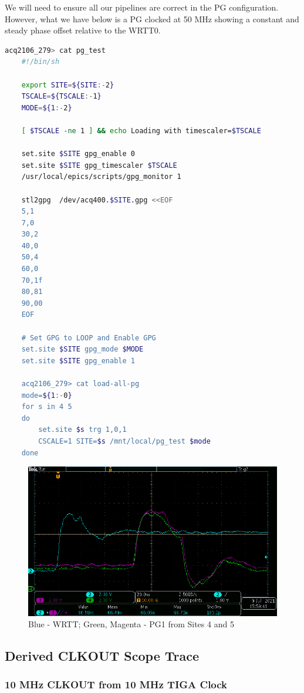 \documentclass[]{article}
\begin{document}
We will need to ensure all our pipelines are correct in the PG configuration. However, what we have below is a PG clocked at 50 MHz showing a constant and steady phase offset relative to the WRTT0.

\begin{center}\begin{lstlisting}[language=bash,style=octavestyle]
	acq2106_279> cat pg_test
	#!/bin/sh
	
	export SITE=${SITE:-2}
	TSCALE=${TSCALE:-1}
	MODE=${1:-2}
	
	[ $TSCALE -ne 1 ] && echo Loading with timescaler=$TSCALE
	
	set.site $SITE gpg_enable 0
	set.site $SITE gpg_timescaler $TSCALE
	/usr/local/epics/scripts/gpg_monitor 1
	
	stl2gpg  /dev/acq400.$SITE.gpg <<EOF
	5,1
	7,0
	30,2
	40,0
	50,4
	60,0
	70,1f
	80,81
	90,00
	EOF
	
	# Set GPG to LOOP and Enable GPG
	set.site $SITE gpg_mode $MODE
	set.site $SITE gpg_enable 1
	
	acq2106_279> cat load-all-pg
	mode=${1:-0}
	for s in 4 5
	do
		set.site $s trg 1,0,1
		CSCALE=1 SITE=$s /mnt/local/pg_test $mode
	done
\end{lstlisting}\end{center}

\begin{figure}[H]
	\centering
	\includegraphics[height=0.5\textwidth]{images/WRTT_vs_PG1_S4_S5}
	\caption{Blue - WRTT; Green, Magenta - PG1 from Sites 4 and 5}
	\label{fig:wrtt_pg}
\end{figure}


\subsection{Derived CLKOUT Scope Trace}
\subsubsection{10 MHz CLKOUT from 10 MHz TIGA Clock}
\end{document}
